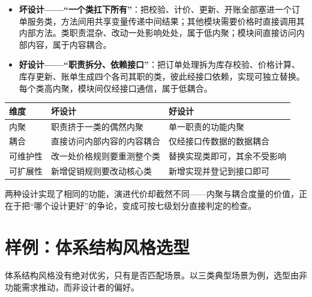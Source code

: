 \documentclass[
]{ctexbook}
\providecommand{\tightlist}{\setlength{\itemsep}{0pt}\setlength{\parskip}{0pt} }
\newcounter{none}
\begin{document}
\begin{itemize}
\tightlist
\item
  \textbf{坏设计------``一个类扛下所有''}：把校验、计价、更新、开账全部塞进一个订单服务类，方法间用共享变量传递中间结果；其他模块需要价格时直接调用其内部方法。类职责混杂、改动一处影响处处，属于低内聚；模块间直接访问内部内容，属于内容耦合。
\item
  \textbf{好设计------``职责拆分、依赖接口''}：把订单处理拆为库存校验、价格计算、库存更新、账单生成四个各司其职的类，彼此经接口依赖，实现可独立替换。每个类高内聚，模块间仅经接口通信，属于低耦合。
\end{itemize}

{\def\LTcaptype{none} %
\begin{longtable}[]{@{}lll@{}}
\toprule\noalign{}
维度 & 坏设计 & 好设计 \\
\midrule\noalign{}
\endhead
\bottomrule\noalign{}
\endlastfoot
内聚 & 职责挤于一类的偶然内聚 & 单一职责的功能内聚 \\
耦合 & 直接访问内部内容的内容耦合 & 仅经接口传数据的数据耦合 \\
可维护性 & 改一处价格规则要重测整个类 & 替换实现类即可，其余不受影响 \\
可扩展性 & 新增促销规则要改动核心类 & 新增实现并登记到接口即可 \\
\end{longtable}
}

两种设计实现了相同的功能，演进代价却截然不同------内聚与耦合度量的价值，正在于把``哪个设计更好''的争论，变成可按七级划分直接判定的检查。

\section{样例：体系结构风格选型}\label{ux6837ux4f8bux4f53ux7cfbux7ed3ux6784ux98ceux683cux9009ux578b}

体系结构风格没有绝对优劣，只有是否匹配场景。以三类典型场景为例，选型由非功能需求推动，而非设计者的偏好。
\end{document}
